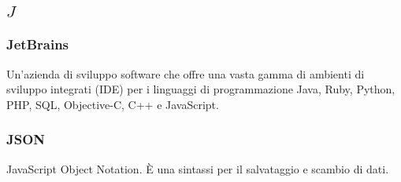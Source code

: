 \subsection*{\quad$J\quad$}

\subsubsection*{JetBrains}
Un'azienda di sviluppo software che offre una vasta gamma di ambienti di sviluppo integrati (IDE) per i linguaggi di programmazione Java, Ruby, Python, PHP, SQL, Objective-C, C++ e JavaScript.

\subsubsection*{JSON}
JavaScript Object Notation. È una sintassi per il salvataggio e scambio di dati. 

